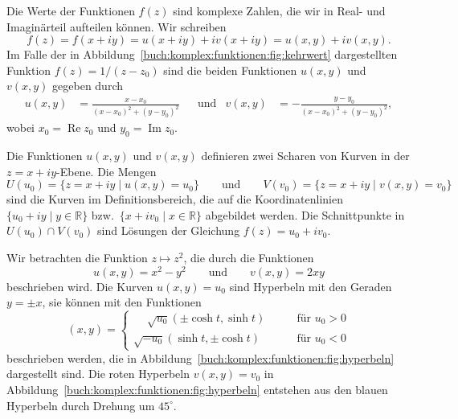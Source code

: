 Die Werte der Funktionen $f(z)$ sind komplexe Zahlen, die wir 
in Real- und Imaginärteil aufteilen können.
Wir schreiben
\[
f(z)
=
f(x+iy)
=
u(x+iy) + iv(x+iy)
=
u(x,y) + iv(x,y).
\]
Im Falle der in 
Abbildung~\ref{buch:komplex:funktionen:fig:kehrwert}
dargestellten Funktion $f(z)=1/(z-z_0)$ sind die
beiden Funktionen $u(x,y)$ und $v(x,y)$  gegeben durch
\begin{align*}
u(x,y)
&=
\frac{x-x_0}{(x-x_0)^2 + (y-y_0)^2}
&&\text{und}&
v(x,y)
&=
-
\frac{y-y_0}{(x-x_0)^2 + (y-y_0)^2},
\end{align*}
wobei $x_0=\operatorname{Re}z_0$ und $y_0=\operatorname{Im}z_0$.

Die Funktionen $u(x,y)$ und $v(x,y)$ definieren zwei Scharen von
Kurven in der $z=x+iy$-Ebene.
Die Mengen
\[
U(u_0)
=
\{
z=x+iy
\mid
u(x,y) = u_0
\}
\qquad\text{und}\qquad
V(v_0)
=
\{
z=x+iy
\mid
v(x,y)
=
v_0
\}
\]
sind die Kurven im Definitionsbereich, die auf die Koordinatenlinien
$\{u_0+iy\mid y\in\mathbb{R}\}$ 
bzw.~$\{x+iv_0\mid x\in\mathbb{R}\}$
abgebildet werden.
Die Schnittpunkte in $U(u_0)\cap V(v_0)$ sind Lösungen der Gleichung
$f(z) = u_0+iv_0$.

\begin{beispiel}
%
Wir betrachten die Funktion $z\mapsto z^2$, die durch die Funktionen
\[
u(x,y) = x^2-y^2
\qquad\text{und}\qquad
v(x,y) = 2xy
\]
beschrieben wird.
%
Die Kurven $u(x,y)=u_0$ sind Hyperbeln mit den Geraden $y=\pm x$, sie
können mit den Funktionen
\[
(x,y)
=
\begin{cases}
\phantom{-}\!\sqrt{u_0}
(\pm\cosh t, \sinh t)
&\qquad\text{für $u_0>0$}
\\
\!\sqrt{-u_0}
(\sinh t, \pm\cosh t)
&\qquad\text{für $u_0<0$}
\end{cases}
\]
beschrieben werden, die in
Abbildung~\ref{buch:komplex:funktionen:fig:hyperbeln}
dargestellt sind.
Die roten Hyperbeln $v(x,y)=v_0$
in Abbildung~\ref{buch:komplex:funktionen:fig:hyperbeln}
entstehen aus den blauen
Hyperbeln durch Drehung um $45^\circ$.
%
%
\end{beispiel}

%
%
